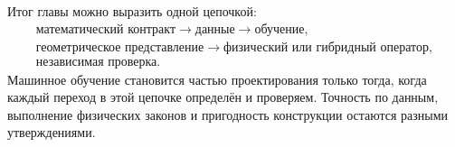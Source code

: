 Итог главы можно выразить одной цепочкой:
\begin{equation}
 \begin{gathered}
  \text{математический контракт}
  \to \text{данные}
  \to \text{обучение},\\
  \text{геометрическое представление}
  \to \text{физический или гибридный оператор},\\
  \text{независимая проверка}.
 \end{gathered}
\end{equation}
Машинное обучение становится частью проектирования только тогда, когда каждый переход в этой цепочке определён и проверяем. Точность по данным, выполнение физических законов и пригодность конструкции остаются разными утверждениями.
